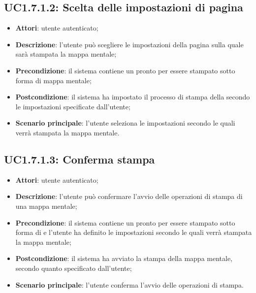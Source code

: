 \subsection{UC1.7.1.2: Scelta delle impostazioni di pagina}
\label{UC1.7.1.2}
\begin{itemize}
\item \textbf{Attori}: utente autenticato;
\item \textbf{Descrizione}: l'utente può scegliere le impostazioni della pagina sulla quale sarà stampata la mappa mentale;
\item \textbf{Precondizione}: il sistema contiene un  pronto per essere stampato sotto forma di mappa mentale;
\item \textbf{Postcondizione}: il sistema ha impostato il processo di stampa della  secondo le impostazioni specificate dall'utente;
\item \textbf{Scenario principale}:
l'utente seleziona le impostazioni secondo le quali verrà stampata la mappa mentale.
\end{itemize}
\subsection{UC1.7.1.3: Conferma stampa}
\label{UC1.7.1.3}
\begin{itemize}
\item \textbf{Attori}: utente autenticato;
\item \textbf{Descrizione}: l'utente può confermare l'avvio delle operazioni di stampa di una mappa mentale;
\item \textbf{Precondizione}: il sistema contiene un  pronto per essere stampato sotto forma di  e l'utente ha definito le impostazioni secondo le quali verrà stampata la mappa mentale;
\item \textbf{Postcondizione}: il sistema ha avviato la stampa della mappa mentale, secondo quanto specificato dall'utente;
\item \textbf{Scenario principale}:
l'utente conferma l'avvio delle operazioni di stampa.
\end{itemize}
